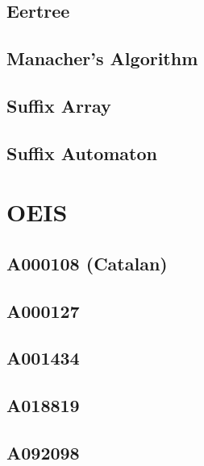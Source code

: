 \subsection{Eertree}

\subsection{Manacher's Algorithm}

\subsection{Suffix Array}

\subsection{Suffix Automaton}

\section{OEIS}
\subsection{A000108 (Catalan)}

\subsection{A000127}

\subsection{A001434}

\subsection{A018819}

\subsection{A092098}

